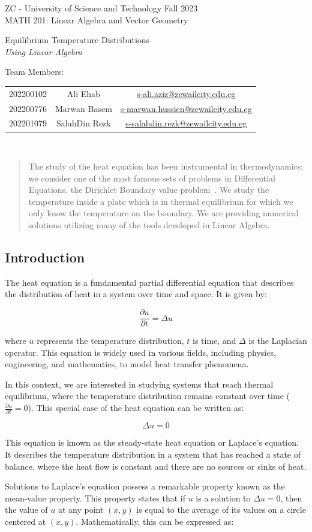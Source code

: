 \documentclass{article}
\makeatletter
\renewcommand{\maketitle}{
  \begin{flushleft}
    ZC - University of Science and Technology
    \hfill Fall 2023 \\
    MATH 201: Linear Algebra and Vector Geometry
  \end{flushleft}
  \begin{center}
    \Huge Equilibrium Temperature Distributions \\
    \LARGE \textit{Using Linear Algebra}
  \end{center}
  \begin{flushleft}
    Team Members: \\

    \begin{tabular}{ccc}
      202200102 & Ali Ehab & \href{mailto:s-ali.aziz@zewailcity.edu.eg}{s-ali.aziz@zewailcity.edu.eg} \\
      202200776 & Marwan Basem & \href{mailto:s-marwan.hussien@zewailcity.edu.eg}{s-marwan.hussien@zewailcity.edu.eg} \\
      202201079 & SalahDin Rezk & \href{mailto:s-salahdin.rezk@zewailcity.edu.eg}{s-salahdin.rezk@zewailcity.edu.eg} \\
    \end{tabular}  \\
  \end{flushleft}
}
\makeatother
\begin{document}
\maketitle
\tableofcontents
\listoffigures

\begin{abstract}
The study of the heat equation has been instrumental in thermodynamics; we consider one of the most famous sets of problems in Differential Equations, the Dirichlet Boundary value problem~\cite{stein}. We study the temperature inside a plate which is in thermal equilibrium for which we only know the temperature on the boundary. We are providing numerical solutions utilizing many of the tools developed in Linear Algebra.    
\end{abstract}

\begin{multicols}{2}
  
\section{Introduction}
The heat equation is a fundamental partial differential equation that describes the distribution of heat in a system over time and space. It is given by:

\begin{equation}
  \frac{\partial u}{\partial t} = \Delta u
\end{equation}

where $u$ represents the temperature distribution, $t$ is time, and $\Delta$ is the Laplacian operator. This equation is widely used in various fields, including physics, engineering, and mathematics, to model heat transfer phenomena.

In this context, we are interested in studying systems that reach thermal equilibrium, where the temperature distribution remains constant over time ($\frac{\partial u}{\partial t} = 0$). This special case of the heat equation can be written as:

\begin{equation}
  \Delta u = 0
\end{equation}

This equation is known as the steady-state heat equation or Laplace's equation. It describes the temperature distribution in a system that has reached a state of balance, where the heat flow is constant and there are no sources or sinks of heat.

Solutions to Laplace's equation possess a remarkable property known as the mean-value property. This property states that if $u$ is a solution to $\Delta u = 0$, then the value of $u$ at any point $(x,y)$ is equal to the average of its values on a circle centered at $(x,y)$. Mathematically, this can be expressed as:


\end{multicols}
\end{document}
